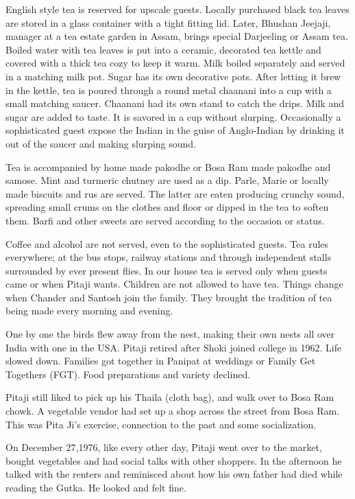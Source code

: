 English style tea is reserved for upscale guests. Locally purchased black
tea leaves are stored in a glass container with a tight fitting lid.
Later, Bhushan Jeejaji, manager at a tea estate garden in Assam, brings
special Darjeeling or Assam tea. Boiled water with tea leaves is put into
a ceramic, decorated tea kettle and covered with a thick tea cozy to keep
it warm. Milk boiled separately and served in a matching milk pot. Sugar
has its own decorative pots. After letting it brew in the kettle, tea is
poured through a round metal chaanani into a cup with a small matching
saucer. Chaanani had its own stand to catch the drips. Milk and sugar are
added to taste. It is savored in a cup without slurping. Occasionally
a sophisticated guest expose the Indian in the guise of Anglo-Indian by
drinking it out of the saucer and making slurping sound. 

Tea is accompanied by home made pakodhe or Bosa Ram made pakodhe and
samose. Mint and turmeric chutney are used as a dip. Parle, Marie or
locally made biscuits and rus are served. The latter are eaten producing
crunchy sound, spreading small crums on the clothes and floor or dipped in
the tea to soften them. Barfi and other sweets are served according to the
occasion or status. 

Coffee and alcohol are not served, even to the sophisticated guests. Tea
rules everywhere; at the bus stops, railway stations and through
independent stalls surrounded by ever present flies. In our house tea is
served only when guests came or when Pitaji wants. Children are not
allowed to have tea. Things change when Chander and Santosh join the
family. They brought the tradition of tea being made every morning and
evening.

One by one the birds flew away from the nest, making their own nests all
over India with one in the USA. Pitaji retired after Shoki joined college
in 1962. Life slowed down. Families got together in Panipat at weddings or
Family Get Togethers (FGT). Food preparations and variety declined. 

Pitaji still liked to pick up his Thaila (cloth bag), and walk over to
Bosa Ram chowk. A vegetable vendor had set up a shop across the street
from Bosa Ram. This was Pita Ji’s exercise, connection to the past and
some socialization. 

On December 27,1976, like every other day, Pitaji went over to the market,
bought vegetables and had social talks with other shoppers. In the
afternoon he talked with the renters and reminisced about how his own
father had died while reading the Gutka. He looked and felt fine. 


